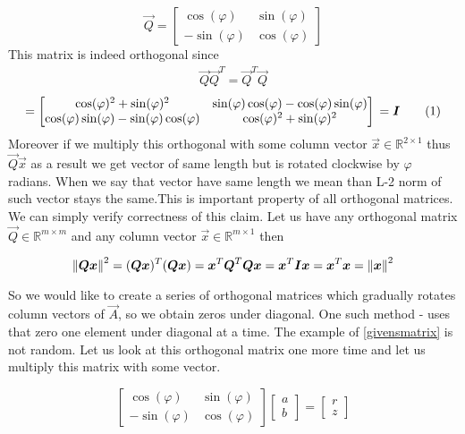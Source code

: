 \begin{equation} \label{givensmatrix}
\vec{Q} = 
\begin{bmatrix} 
\cos(\varphi) & \sin(\varphi) \\
- \sin(\varphi) & \cos(\varphi)
\end{bmatrix}
\end{equation}
This matrix is indeed orthogonal since 
\begin{align*} 
\vec{Q}\vec{Q}^T = \vec{Q}^T\vec{Q}    
\end{align*}
 \begin{equation*}
    = \begin{bmatrix} 
        \cos(\varphi)^2 + \sin(\varphi)^2  & \sin(\varphi)\cos(\varphi) - \cos(\varphi)\sin(\varphi) \\
        \cos(\varphi)\sin(\varphi) - \sin(\varphi)\cos(\varphi) & \cos(\varphi)^2 + \sin(\varphi)^2
    \end{bmatrix} \\ = \vec{I}
    \numberthis
\end{equation*}
Moreover if we multiply this orthogonal with some column vector $\vec{x} \in \mathbb{R}^{2 \times 1}$ thus $\vec{Q}\vec{x}$ as a result we get vector of same length but is rotated clockwise by  $\varphi$ radians. When we say that vector have same length we mean than L-2 norm of such vector stays the same.This is important property of all orthogonal matrices. We can simply verify correctness of this claim. Let us have any orthogonal matrix $\vec{Q} \in \mathbb{R}^{m \times m}$ and any column vector $\vec{x} \in  \mathbb{R}^{m \times 1}$ then

\begin{equation}
    \left\lVert\boldsymbol{Q}\boldsymbol{x}\right\rVert^2 = (\boldsymbol{Q}\boldsymbol{x})^T (\boldsymbol{Q}\boldsymbol{x}) = \boldsymbol{x}^T\boldsymbol{Q}^T\boldsymbol{Q}\boldsymbol{x} = 
    \boldsymbol{x}^T\boldsymbol{I}\boldsymbol{x} = \boldsymbol{x}^T\boldsymbol{x} = \left\lVert\boldsymbol{x}\right\rVert^2
\end{equation}

So we would like to create a series of orthogonal matrices which gradually rotates column vectors of $\vec{A}$, so we obtain zeros under diagonal. One such method -  uses  that zero one element under diagonal at a time.
The example of \ref{givensmatrix} is not random. Let us look at this orthogonal matrix one more time and let us multiply this matrix with some vector.

\begin{equation}
    \begin{bmatrix} 
        \cos(\varphi) & \sin(\varphi) \\
        - \sin(\varphi) & \cos(\varphi)
        \end{bmatrix}
        \begin{bmatrix} 
            a \\
            b
            \end{bmatrix} = 
            \begin{bmatrix} 
                r \\
                z
                \end{bmatrix}
\end{equation}


